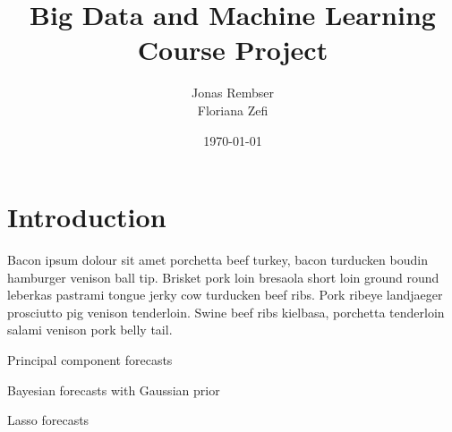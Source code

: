 \documentclass[a4paper,11pt]{scrartcl}
\title{Big Data and Machine Learning \\ Course Project}
\author{Jonas Rembser\\Floriana Zefi}
\date{\today}
\begin{document}
\maketitle

%
\section{Introduction}

Bacon ipsum dolour sit amet porchetta beef turkey, bacon turducken boudin hamburger venison ball tip. Brisket pork loin bresaola short loin ground round leberkas pastrami tongue jerky cow turducken beef ribs. Pork ribeye landjaeger prosciutto pig venison tenderloin. Swine beef ribs kielbasa, porchetta tenderloin salami venison pork belly tail.

\begin{table}[ht]
    \caption{Principal component forecasts}
    \centering
    
    \begin{center}
    
    \end{center}
    \label{table:pc}
\end{table}

\begin{table}[ht]
    \caption{Bayesian forecasts with Gaussian prior}
    \centering
    
    \begin{center}
    
    \end{center}
    \label{table:ridge}
\end{table}

\begin{table}[ht]
    \caption{Lasso forecasts}
    \centering
    
    \begin{center}
    
    \end{center}
    \label{table:lasso}
\end{table}


%
%
\end{document}
